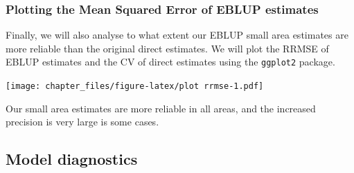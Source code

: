 \documentclass[
]{article}
\newenvironment{Shaded}{\begin{snugshade}}{\end{snugshade}}
\newcommand{\CommentTok}[1]{\textcolor[rgb]{0.56,0.35,0.01}{\textit{#1}}}
\newcommand{\DataTypeTok}[1]{\textcolor[rgb]{0.13,0.29,0.53}{#1}}
\newcommand{\DecValTok}[1]{\textcolor[rgb]{0.00,0.00,0.81}{#1}}
\newcommand{\KeywordTok}[1]{\textcolor[rgb]{0.13,0.29,0.53}{\textbf{#1}}}
\newcommand{\NormalTok}[1]{#1}
\newcommand{\OperatorTok}[1]{\textcolor[rgb]{0.81,0.36,0.00}{\textbf{#1}}}
\newcommand{\StringTok}[1]{\textcolor[rgb]{0.31,0.60,0.02}{#1}}
\begin{document}
\hypertarget{plotting-the-mean-squared-error-of-eblup-estimates}{%
\subsubsection{Plotting the Mean Squared Error of EBLUP
estimates}\label{plotting-the-mean-squared-error-of-eblup-estimates}}

Finally, we will also analyse to what extent our EBLUP small area
estimates are more reliable than the original direct estimates. We will
plot the RRMSE of EBLUP estimates and the CV of direct estimates using
the \texttt{ggplot2} package.

\begin{Shaded}
\end{Shaded}

\texttt{[image: chapter\_files/figure-latex/plot rrmse-1.pdf]}

Our small area estimates are more reliable in all areas, and the
increased precision is very large is some cases.

\hypertarget{model-diagnostics}{%
\subsection{Model diagnostics}\label{model-diagnostics}}
\end{document}
